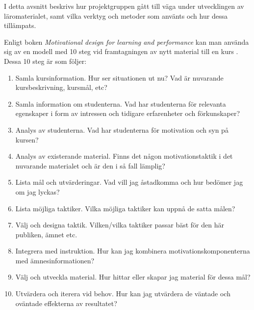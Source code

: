 \documentclass[12pt,a4paper,twoside,openright]{article}
\begin{document}

I detta avsnitt beskrivs hur projektgruppen gått till väga under
utvecklingen av läromaterialet, samt vilka verktyg och metoder som
använts och hur dessa tillämpats.

Enligt boken \textit{Motivational design for learning and performance}
kan man använda sig av en modell med 10 steg vid framtagningen av nytt
material till en kurs \cite{motivational_design}. Dessa 10 steg är som
följer:

\begin{enumerate}
\item Samla kursinformation. Hur ser situationen ut nu? Vad är
  nuvarande kursbeskrivning, kursmål, etc?

\item Samla information om studenterna. Vad har studenterna för
  relevanta egenskaper i form av intressen och tidigare erfarenheter
  och förkunskaper?

\item Analys av studenterna. Vad har studenterna för motivation och
  syn på kursen?

\item Analys av existerande material. Finns det någon
  motivationstaktik i det nuvarande materialet och är den i så fall
  lämplig?

\item Lista mål och utvärderingar. Vad vill jag åstadkomma och hur
  bedömer jag om jag lyckas?

\item Lista möjliga taktiker. Vilka möjliga taktiker kan uppnå de
  satta målen?

\item Välj och designa taktik. Vilken/vilka taktiker passar bäst för
  den här publiken, ämnet etc.

\item Integrera med instruktion. Hur kan jag kombinera
  motivationskomponenterna med ämnesinformationen?

\item Välj och utveckla material. Hur hittar eller skapar jag material
  för dessa mål?

\item Utvärdera och iterera vid behov. Hur kan jag utvärdera de
  väntade och oväntade effekterna av resultatet?

\end{enumerate}
\end{document}
